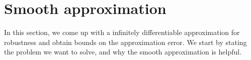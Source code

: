 \section{Smooth approximation}
\label{sec:smooth apx}
\newcommand{\fe}{f_\varepsilon}

In this section, we come up with a infinitely differentiable approximation for robustness and obtain bounds on the approximation error. We start by stating the problem we want to solve, and why the smooth approximation is helpful.





